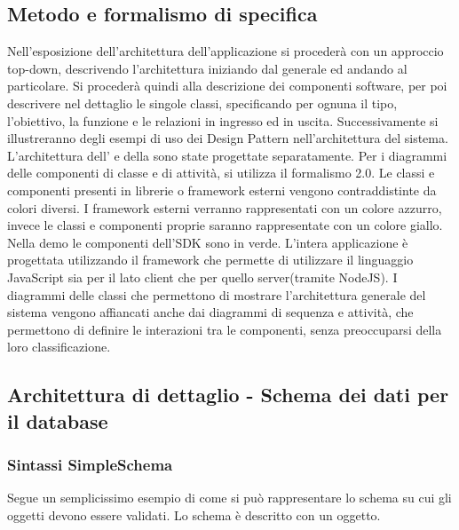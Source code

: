 \subsection{Metodo e formalismo di specifica}

Nell’esposizione dell’architettura dell’applicazione si procederà con
un approccio top-down, descrivendo l’architettura iniziando dal
generale ed andando al particolare. 
Si procederà quindi alla descrizione dei componenti software, per poi descrivere
nel dettaglio le singole classi, specificando per ognuna il tipo, l’obiettivo, la funzione e
le relazioni in ingresso ed in uscita.
Successivamente si illustreranno degli esempi di uso dei Design
Pattern nell’architettura del sistema. 
L'architettura dell'  e della  sono state progettate separatamente.  
Per i diagrammi delle componenti di classe e di attività, si utilizza
il formalismo  2.0. Le classi e componenti presenti in librerie o
framework esterni vengono contraddistinte da colori diversi. I
framework esterni verranno rappresentati con un colore azzurro, invece
le classi e componenti proprie saranno rappresentate con un
colore giallo. Nella demo le componenti dell'SDK sono in verde.
L'intera applicazione è progettata utilizzando il framework
 che permette di utilizzare il linguaggio JavaScript
sia per il lato client che per quello server(tramite NodeJS). 
I diagrammi delle classi che permettono di mostrare l’architettura
generale del sistema vengono affiancati anche dai diagrammi di
sequenza e attività, che permettono di definire le interazioni tra le
componenti, senza preoccuparsi della loro classificazione. 






\subsection{Architettura di dettaglio - Schema dei dati per il
  database}
\subsubsection{Sintassi SimpleSchema}

Segue un semplicissimo esempio di come si può rappresentare lo schema
su cui gli oggetti devono essere validati. Lo schema è descritto con
un oggetto.

